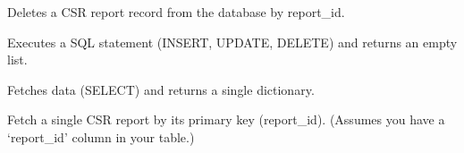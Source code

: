 \documentclass[letterpaper,10pt,english]{sphinxmanual}
\begin{document}
\begin{fulllineitems}
\begin{fulllineitems}
\label{\detokenize{src:src.db_utils.postgres.PostgreSQLDB.delete_csr_report}}
\pysigstartsignatures
{}
\pysigstopsignatures
\sphinxAtStartPar
Deletes a CSR report record from the database by report\_id.

\end{fulllineitems}


\begin{fulllineitems}
\label{\detokenize{src:src.db_utils.postgres.PostgreSQLDB.execute}}
\pysigstartsignatures
{}
\pysigstopsignatures
\sphinxAtStartPar
Executes a SQL statement (INSERT, UPDATE, DELETE) and returns an empty list.

\end{fulllineitems}


\begin{fulllineitems}
\label{\detokenize{src:src.db_utils.postgres.PostgreSQLDB.fetch}}
\pysigstartsignatures
{}
\pysigstopsignatures
\sphinxAtStartPar
Fetches data (SELECT) and returns a single dictionary.

\end{fulllineitems}


\begin{fulllineitems}
\label{\detokenize{src:src.db_utils.postgres.PostgreSQLDB.get_csr_report_by_id}}
\pysigstartsignatures
{}
\pysigstopsignatures
\sphinxAtStartPar
Fetch a single CSR report by its primary key (report\_id).
(Assumes you have a ‘report\_id’ column in your table.)


\end{fulllineitems}
\end{fulllineitems}
\end{document}
